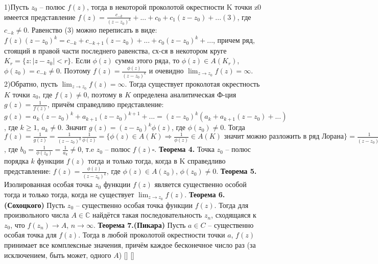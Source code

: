     1)Пусть $z_0$ – полюс $f(z)$, тогда в некоторой проколотой окрестности K точки z0 имеется представление $f(z)=\frac{c_{-k}}{(z-z_0)^k}+...+c_0+c_1(z-z_0)+...(3)$,
    где $c_{-k}\neq0$. Равенство (3) можно переписать в виде:
    $f(z)(z-z_0)^k=c_{-k}+c_{-k+1}(z-z_0)+...+c_0(z-z_0)^k+...$, причем ряд, стоящий в правой части последнего равенства, сх-ся в некотором круге $K_r=\{z:|z-z_0|<r\}$. Если $\phi(z)$ сумма этого ряда, то $\phi(z) \in A(K_r)$, $\phi(z_0)=c_{-k}\neq0$. Поэтому $f(z)=\frac{\phi(z)}{(z-z_0)^k}$ и очевидно $\displaystyle\lim_{z\rightarrow z_0}f(z)=\infty$.
    2)Обратно, пусть $\displaystyle\lim_{z\rightarrow z_0}f(z)=\infty$. Тогда существует
    проколотая окрестность $K$ точки $z_0$, где $f(z) \neq 0$, поэтому
    в $K$ определена аналитическая Ф-ция $g(z) = \frac{1}{f(z)}$, причём справедливо представление: $g(z)=a_k(z-z_0)^k+a_{k+1}(z-z_0)^{k+1}+...=(z-z_0)^k(a_k+a_{k+1}(z-z_0)+...)$, где $k\geq1$, $a_k\neq0$. Значит $g(z)=(z-z_0)^k\phi(z)$, где $\phi(z_0)\neq0$. Тогда $f(z)=\frac{1}{g(z)}=\frac{1}{(z-z_0)^k}\frac{1}{\phi(z)}=\{\phi(z) \in A(K) \Rightarrow \frac{1}{\phi(z)} \in A(K) \text{ значит можно разложить в ряд Лорана}\}=
    \frac{1}{(z-z_0)^k}(b_0+b_1(z-z_0)+...)$, где $b_0=\frac{1}{\phi(z_0)}=\frac{1}{a_k}\neq0$, т.e $z_0$ -- полюс $f(z) \square$.
\textbf{Теорема 4.} Точка $z_0$ – полюс порядка $k$ функции $f(z)$ тогда и только тогда, когда в K справедливо представление: $f(z)=\frac{\phi(z)}{(z-z_0)^k}$, где $\phi(z)\in A(z_0)$, $\phi(z_0)\neq 0$.
\textbf{Теорема 5.} Изолированная особая точка $z_0$ функции
 $f(z)$ является существенно особой тогда и только тогда,
когда не существует $\displaystyle\lim_{z\rightarrow z_0}f(z)$.
\textbf{Теорема 6.(Сохоцкого)} Пусть $z_0$ – существенно особая точка функции $f(z)$. Тогда
для произвольного числа $A \in \mathbb{C}$ найдётся такая последовательность ${z_n}$, сходящаяся к $z_0$, что $f(z_n)\rightarrow A$, $n \rightarrow \infty$.
\textbf{Теорема 7.(Пикара)} Пусть $a \in C$ – существенно особая точка для $f(z)$. Тогда в любой проколотой окрестности
точки $a$, $f(z)$ принимает все комплексные значения, причём каждое бесконечное число раз
(за исключением, быть может, одного $A$)
[\cite{tfkp_stud_ticket}]
[\cite{tfkp_msu}]